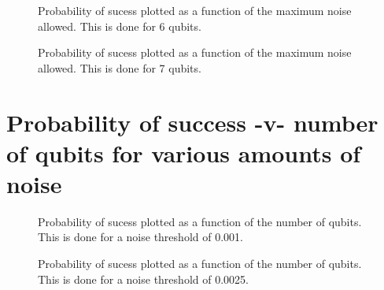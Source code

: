 \pagebreak

\begin{figure}[h]
\begin{center}
\end{center}
\caption{Probability of sucess plotted as a function of the maximum noise allowed.
This is done for 6 qubits.}
\end{figure}

\pagebreak

\begin{figure}[h]
\begin{center}
\end{center}
\caption{Probability of sucess plotted as a function of the maximum noise allowed.
This is done for 7 qubits.}
\end{figure}

\pagebreak

\vfill
\section{Probability of success -v- number of qubits for various amounts of noise}
\vfill

\pagebreak


\begin{figure}[h]
\begin{center}
\end{center}
\caption{Probability of sucess plotted as a function of the number of qubits. This
is done for a noise threshold of 0.001.}
\end{figure}

\pagebreak

\begin{figure}[h]
\begin{center}
\end{center}
\caption{Probability of sucess plotted as a function of the number of qubits. This
is done for a noise threshold of 0.0025.}
\end{figure}

